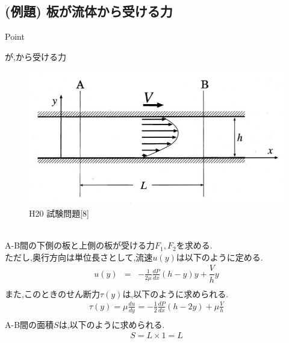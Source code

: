 \documentclass[a4paper]{jsarticle}
\begin{document}
\subsection{(例題) 板が流体から受ける力}
\begin{itembox}[l]{Point}
    \begin{center}
        が,から受ける力
    \end{center}
\end{itembox}
\begin{figure}[htbp]
    \begin{center}
        \includegraphics[width=120mm]{images/ryuriki_image3.jpg}
        \caption{H20 試験問題[8]}
    \end{center}
\end{figure}
\\
A-B間の下側の板と上側の板が受ける力$F_1,F_2$を求める.\\
ただし,奥行方向は単位長さとして,流速$u\left(y\right)$は以下のように定める.
\begin{eqnarray*}
    u\left(y\right)&=&-\frac{1}{2\mu}\frac{dP}{dx}\left(h-y\right)y+\dfrac{V}{h}y\\
\end{eqnarray*}
また,このときのせん断力$\tau \left(y\right)$は,以下のように求められる.
\begin{eqnarray*}
    \tau \left(y\right) = \mu \frac{du}{dy} = -\frac{1}{2}\frac{dP}{dx}\left(h-2y\right)+\mu\frac{V}{h}\\
\end{eqnarray*}
A-B間の面積$S$は,以下のように求められる.
\begin{eqnarray*}
    S=L\times 1 =L\\
\end{eqnarray*}
\end{document}
